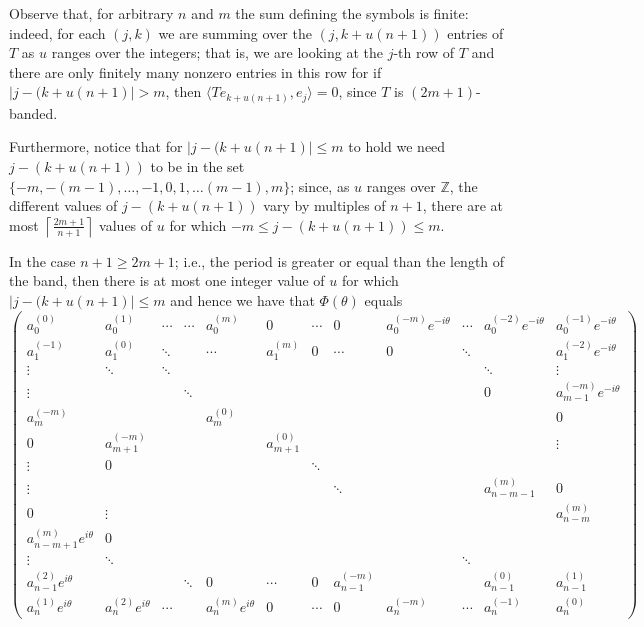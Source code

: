 \documentclass[12pt,reqno]{amsart}
\theoremstyle{definition}
\newcommand{\Z}{{\mathbb{Z}}}
\newcommand\eit{e^{i\theta}}
\newcommand\neit{e^{-i\theta}}
\begin{document}
Observe that, for arbitrary $n$ and $m$ the sum defining the symbols is finite: indeed, for each $(j,k)$ we are summing over the $(j,k+u(n+1))$ entries of $T$ as $u$ ranges over the integers; that is, we are looking at the $j$-th row of $T$ and there are only finitely many nonzero entries in this row for if $|j-(k+u(n+1)|>m$, then $\langle T e_{k+u(n+1)}, e_j \rangle=0$, since $T$ is $(2m+1)$-banded. 


Furthermore, notice that for $|j-(k+u(n+1)|\leq m$ to hold we need $j-(k+u(n+1))$ to be in the set $\{-m,-(m-1), \dots, -1, 0, 1, \dots (m-1), m \}$; since, as $u$ ranges over $\Z$, the different values of $j-(k+u(n+1))$ vary by multiples of $n+1$, there are at most $\left\lceil \frac{2m+1}{n+1}\right\rceil$ values of $u$ for which $-m \leq j-(k+u(n+1)) \leq m$. 

In the case $n+1 \geq 2m+1$; i.e., the period is greater or equal than the length of the band, then there is at most one integer value of $u$ for which $|j-(k+u(n+1)|\leq m$ and hence we have that $\Phi(\theta)$ equals
\begin{equation}\label{eq:matrix}
\begin{pmatrix}
  a_0^{(0)} & a_0^{(1)} & \cdots  & \cdots & a_0^{(m)} & 0 & \cdots & 0 & a_0^{(-m)} \neit & \cdots & a_0^{(-2)} \neit & a_0^{(-1)} \neit \\[5pt]
  a_1^{(-1)} & a_1^{(0)} & \ddots & &  \cdots & a_1^{(m)} & 0 & \cdots & 0 & \ddots &  & a_1^{(-2)} \neit \\[5pt]
 \vdots & \ddots & \ddots & & & & & & & & \ddots & \vdots \\[5pt]
\vdots & &  & \ddots & & & & & & & 0 & a_{m-1}^{(-m)} \neit \\[5pt]
 a_m^{(-m)} & & & & a_m^{(0)}& & & & & & & 0\\[5pt]
 0 & a_{m+1}^{(-m)} & & & & a_{m+1}^{(0)}& & & & & & \vdots \\[5pt] 
 \vdots & 0 & & & & & \ddots \\[5pt]
 \vdots & & & & & & &  \ddots & & & a_{n-m-1}^{(m)}& 0\\[5pt]
 0 & \vdots & & & & & &  &  & & & a_{n-m}^{(m)}\\[5pt]
 a_{n-m+1}^{(m)} \eit & 0 \\[5pt]
 \vdots & \ddots & & & & & & & &  \ddots\\[5pt]
 a_{n-1}^{(2)} \eit & &  & \ddots & 0 & \cdots & 0 &  a_{n-1}^{(-m)}& & & a_{n-1}^{(0)} & a_{n-1}^{(1)}\\[5pt]
  a_n^{(1)} \eit & a_n^{(2)} \eit & \cdots &  & a_n^{(m)} \eit & 0 & \cdots & 0 & a_n^{(-m)}& \cdots & a_n^{(-1)} &a_n^{(0)}
\end{pmatrix}
\end{equation}
\end{document}
